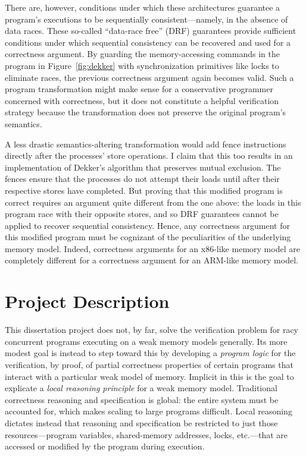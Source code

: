 \documentclass[11pt]{report}
\begin{document}
There are, however, conditions under which these architectures guarantee a program's executions to be sequentially consistent---namely, in the absence of data races. These so-called ``data-race free'' (DRF) guarantees provide sufficient conditions under which sequential consistency can be recovered and used for a correctness argument. By guarding the memory-accessing commands in the program in Figure~\ref{fig:dekker} with synchronization primitives like locks to eliminate races, the previous correctness argument again becomes valid. Such a program transformation might make sense for a conservative programmer concerned with correctness, but it does not constitute a helpful verification strategy because the transformation does not preserve the original program's semantics.

A less drastic semantics-altering transformation would add fence instructions directly after the processes' store operations. I claim that this too results in an implementation of Dekker's algorithm that preserves mutual exclusion. The fences ensure that the processes do not attempt their loads until after their respective stores have completed. But proving that this modified program is correct requires an argument quite different from the one above: the loads in this program race with their opposite stores, and so DRF guarantees cannot be applied to recover sequential consistency. Hence, any correctness argument for this modified program must be cognizant of the peculiarities of the underlying memory model. Indeed, correctness arguments for an x86-like memory model are completely different for a correctness argument for an ARM-like memory model.

\section{Project Description}

This dissertation project does not, by far, solve the verification problem for racy concurrent programs executing on a weak memory models generally. Its more modest goal is instead to step toward this by developing a \emph{program logic} for the verification, by proof, of partial correctness properties of certain programs that interact with a particular weak model of memory. Implicit in this is the goal to explicate a \emph{local reasoning principle} for a weak memory model. Traditional correctness reasoning and specification is global: the entire system must be accounted for, which makes scaling to large programs difficult. Local reasoning dictates instead that reasoning and specification be restricted to just those resources---program variables, shared-memory addresses, locks, etc.---that are accessed or modified by the program during execution.
\end{document}
